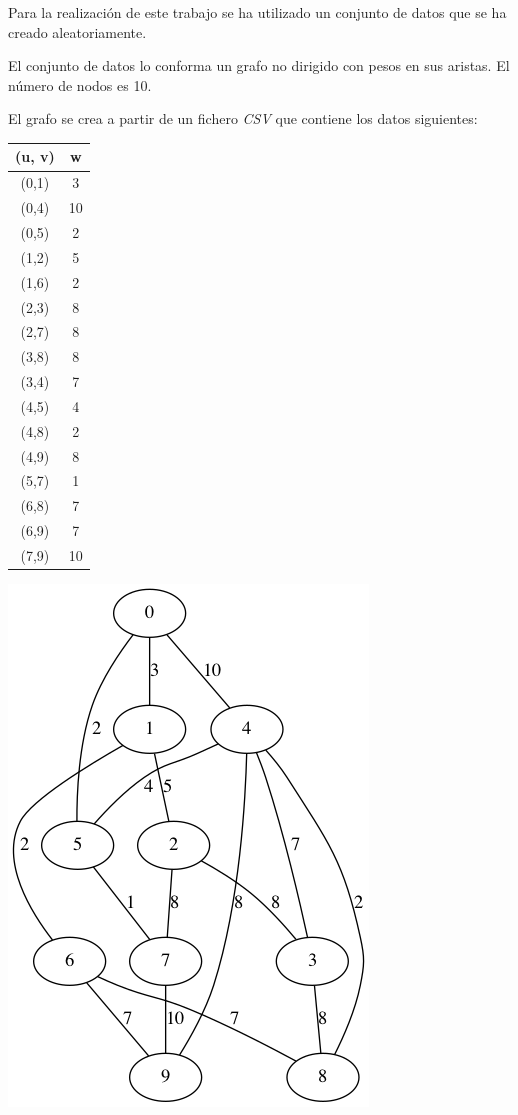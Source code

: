 Para la realización de este trabajo se ha utilizado un conjunto de datos que se ha creado aleatoriamente. 

El conjunto de datos lo conforma un grafo no dirigido con pesos en sus aristas. El número de nodos es 10.

El grafo se crea a partir de un fichero \textit{CSV} que contiene los datos siguientes:

\begin{center}
	\begin{tabular}{ |c|c| } 
		(u, v) & w \\ 
		\hline
		(0,1) & 3 \\
		(0,4) & 10 \\
		(0,5) & 2 \\
		(1,2) & 5 \\
		(1,6) & 2 \\
		(2,3) & 8 \\
		(2,7) & 8 \\
		(3,8) & 8 \\
		(3,4) & 7 \\
		(4,5) & 4 \\
		(4,8) & 2 \\
		(4,9) & 8 \\
		(5,7) & 1 \\
		(6,8) & 7 \\
		(6,9) & 7 \\
		(7,9) & 10 \\
		\hline
	\end{tabular}
\end{center}

\begin{center}
	\includegraphics[scale=0.5]{../dataset/dataset}
\end{center}